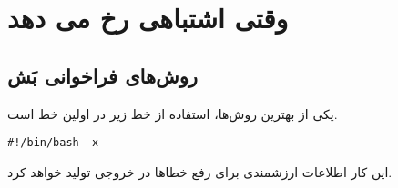 \chapter{وقتی اشتباهی رخ می دهد}
\section*{روش‌های فراخوانی بَش}
یکی از بهترین روش‌‌ها، استفاده از خط زیر‌ در اولین خط است‌.
\begin{latin}
\begin{lstlisting}
#!/bin/bash -x
\end{lstlisting}
\end{latin}
این کار اطلاعات ارزشمندی برای رفع خطاها در خروجی تولید خواهد کرد‌.